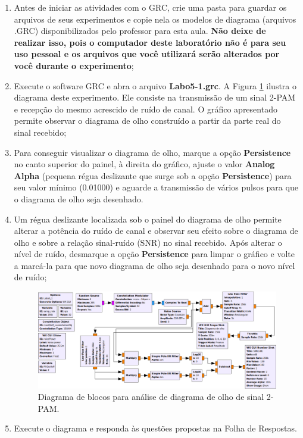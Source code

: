 \documentclass[12pt,addpoints]{exam}
\begin{document}
\begin{enumerate}
    \item Antes de iniciar as atividades com o GRC, crie uma pasta para guardar os arquivos de seus experimentos e copie nela os modelos de diagrama (arquivos .GRC) disponibilizados pelo professor para esta aula. \textbf{Não deixe de realizar isso, pois o computador deste laboratório não é para seu uso pessoal e os arquivos que você utilizará serão alterados por você durante o experimento};
    \item Execute o software GRC e abra o arquivo \textbf{Labo5-1.grc}. A Figura \ref{fig:GRC_5-1} ilustra o diagrama deste experimento. Ele consiste na transmissão de um sinal 2-PAM e recepção do mesmo acrescido de ruído de canal. O gráfico apresentado permite observar o diagrama de olho construído a partir da parte real do sinal recebido;
    \item Para conseguir visualizar o diagrama de olho, marque a opção \textbf{Persistence} no canto superior do painel, à direita do gráfico, ajuste o valor \textbf{Analog Alpha} (pequena régua deslizante que surge sob a opção \textbf{Persistence}) para seu valor mínimo (0.01000) e aguarde a transmissão de vários pulsos para que o diagrama de olho seja desenhado. 
    \item Um régua deslizante localizada sob o painel do diagrama de olho permite alterar a potência do ruído de canal e observar seu efeito sobre o diagrama de olho e sobre a relação sinal-ruído (SNR) no sinal recebido. Após alterar o nível de ruído, desmarque a opção \textbf{Persistence} para limpar o gráfico e volte a marcá-la para que novo diagrama de olho seja desenhado para o novo nível de ruído;
    \begin{figure}[htb]
        \centering
        \includegraphics[width=\textwidth]{Figuras/Labo5-1}
        \caption{Diagrama de blocos para análise de diagrama de olho de sinal 2-PAM.}
        \label{fig:GRC_5-1}
    \end{figure}
  \item Execute o diagrama e responda às questões propostas na Folha de Respostas.
\end{enumerate}
\end{document}
